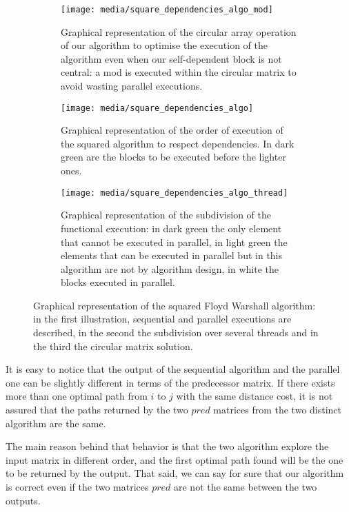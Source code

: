 \begin{figure}[htbp]
    \centering
    \begin{subfigure}[t]{0.3\textwidth}
        \texttt{[image: media/square\_dependencies\_algo\_mod]}
        
        \caption{Graphical representation of the circular array operation of our algorithm to optimise the execution of the algorithm even when our self-dependent block is not central: a mod is executed within the circular matrix to avoid wasting parallel executions.}
        \label{fig:square-dependecies-circular}
    \end{subfigure}
    \begin{subfigure}[t]{0.3\textwidth}
        \texttt{[image: media/square\_dependencies\_algo]}
        
        \caption{Graphical representation of the order of execution of the squared algorithm to respect dependencies. In dark green are the blocks to be executed before the lighter ones.}
        \label{fig:square-dependecies-algo}
    \end{subfigure}
    \begin{subfigure}[t]{0.3\textwidth}
        \texttt{[image: media/square\_dependencies\_algo\_thread]}
        
        \caption{Graphical representation of the subdivision of the functional execution: in dark green the only element that cannot be executed in parallel, in light green the elements that can be executed in parallel but in this algorithm are not by algorithm design, in white the blocks executed in parallel.}
        \label{fig:square-dependecies-thread}
    \end{subfigure}
    \caption{Graphical representation of the squared Floyd Warshall algorithm: in the first illustration, sequential and parallel executions are described, in the second the subdivision over several threads and in the third the circular matrix solution.}
        \label{fig:square-algo}
\end{figure}

It is easy to notice that the output of the sequential algorithm and the parallel one can be slightly different in terms of the predecessor matrix. If there exists more than one optimal path from \(i\) to \(j\) with the same distance cost, it is not assured that the paths returned by the two \(pred\) matrices from the two distinct algorithm are the same. 

The main reason behind that behavior is that the two algorithm explore the input matrix in different order, and the first optimal path found will be the one to be returned by the output. That said, we can say for sure that our algorithm is correct even if the two matrices \(pred\) are not the same between the two outputs.

\FloatBarrier
